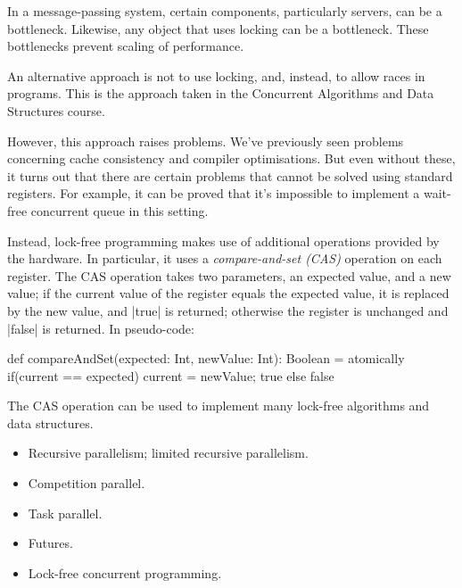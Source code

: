 \documentclass[notes,color]{sepslide0}
\begin{document}

\begin{slide}

In a message-passing system, certain components, particularly servers, can be
a bottleneck.  Likewise, any object that uses locking can be a bottleneck.
These bottlenecks prevent scaling of performance.

An alternative approach is not to use locking, and, instead, to allow races in
programs.  This is the approach taken in the Concurrent Algorithms and Data
Structures course.

However, this approach raises problems.  We've previously seen problems
concerning cache consistency and compiler optimisations.  But even without
these, it turns out that there are certain problems that cannot be solved
using standard registers.  For example, it can be proved that it's impossible
to implement a wait-free concurrent queue in this setting.
\end{slide}


\begin{slide}

Instead, lock-free programming makes use of additional operations provided by
the hardware.  In particular, it uses a \emph{compare-and-set (CAS)} operation
on each register.  The CAS operation takes two parameters, an expected value,
and a new value; if the current value of the register equals the expected
value, it is replaced by the new value, and |true| is returned; otherwise the
register is unchanged and |false| is returned.  In pseudo-code:
%
\begin{scala}
def compareAndSet(expected: Int, newValue: Int): Boolean = atomically{
  if(current == expected){ current = newValue; true } else false
}
\end{scala}

The CAS operation can be used to implement many lock-free algorithms and data
structures. 
\end{slide}




\begin{slide}

\begin{itemize}
\item
Recursive parallelism; limited recursive parallelism.

\item
Competition parallel.

\item 
Task parallel.

\item
Futures.

\item
Lock-free concurrent programming.
\end{itemize}
\end{slide}
\end{document}
